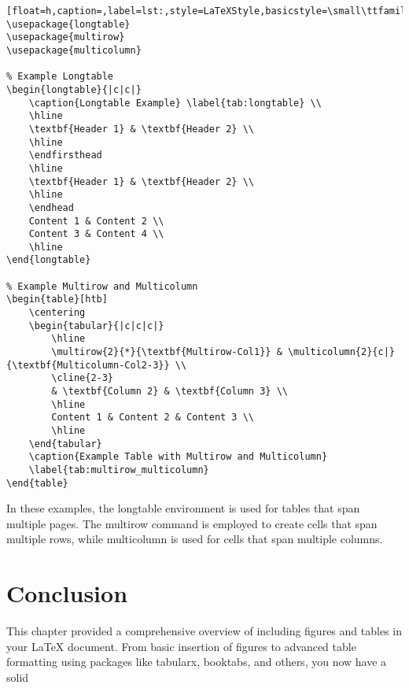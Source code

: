 \begin{lstlisting}[float=h,caption=,label=lst:,style=LaTeXStyle,basicstyle=\small\ttfamily,]
\usepackage{longtable}
\usepackage{multirow}
\usepackage{multicolumn}

% Example Longtable
\begin{longtable}{|c|c|}
    \caption{Longtable Example} \label{tab:longtable} \\
    \hline
    \textbf{Header 1} & \textbf{Header 2} \\
    \hline
    \endfirsthead
    \hline
    \textbf{Header 1} & \textbf{Header 2} \\
    \hline
    \endhead
    Content 1 & Content 2 \\
    Content 3 & Content 4 \\
    \hline
\end{longtable}

% Example Multirow and Multicolumn
\begin{table}[htb]
    \centering
    \begin{tabular}{|c|c|c|}
        \hline
        \multirow{2}{*}{\textbf{Multirow-Col1}} & \multicolumn{2}{c|}{\textbf{Multicolumn-Col2-3}} \\
        \cline{2-3}
        & \textbf{Column 2} & \textbf{Column 3} \\
        \hline
        Content 1 & Content 2 & Content 3 \\
        \hline
    \end{tabular}
    \caption{Example Table with Multirow and Multicolumn}
    \label{tab:multirow_multicolumn}
\end{table}
\end{lstlisting}

In these examples, the longtable environment is used for tables that span multiple pages. The multirow command is employed to create cells that span multiple rows, while multicolumn is used for cells that span multiple columns.

\section{Conclusion}

This chapter provided a comprehensive overview of including figures and tables in your LaTeX document. From basic insertion of figures to advanced table formatting using packages like tabularx, booktabs, and others, you now have a solid



